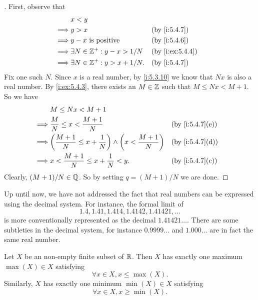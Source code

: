 \begin{proof}[]
  First, observe that
  \begin{align*}
             & x < y                                                    \\
    \implies & y > x                               &  & \by{i:5.4.7}    \\
    \implies & y - x \text{ is positive}           &  & \by{i:5.4.6}    \\
    \implies & \exists N \in \Z^+ : y - x > 1 / N  &  & \by{i:ex:5.4.4} \\
    \implies & \exists N \in \Z^+ : y > x + 1 / N. &  & \by{i:5.4.7}
  \end{align*}
  Fix one such \(N\).
  Since \(x\) is a real number, by \cref{i:5.3.10} we know that \(Nx\) is also a real number.
  By \cref{i:ex:5.4.3}, there exists an \(M \in \mathbb{Z}\) such that \(M \leq Nx < M + 1\).
  So we have
  \begin{align*}
             & M \leq Nx < M + 1                                                                                \\
    \implies & \dfrac{M}{N} \leq x < \dfrac{M + 1}{N}                                      &  & \by{i:5.4.7}[e] \\
    \implies & \pa{\dfrac{M + 1}{N} \leq x + \dfrac{1}{N}} \land \pa{x < \dfrac{M + 1}{N}} &  & \by{i:5.4.7}[d] \\
    \implies & x < \dfrac{M + 1}{N} \leq x + \dfrac{1}{N} < y.                             &  & \by{i:5.4.7}[c]
  \end{align*}
  Clearly, \((M + 1) / N \in \mathbb{Q}\).
  So by setting \(q = (M + 1) / N\) we are done.
\end{proof}

\begin{rmk}\label{i:5.4.15}
  Up until now, we have not addressed the fact that real numbers can be expressed using the decimal system.
  For instance, the formal limit of
  \[
    1.4, 1.41, 1.414, 1.4142, 1.41421, \dots
  \]
  is more conventionally represented as the decimal \(1.41421\dots\).
  There are some subtleties in the decimal system, for instance \(0.9999\dots\) and \(1.000\dots\) are in fact the same real number.
\end{rmk}

\begin{ac}\label{i:ac:5.4.2}
  Let \(X\) be an non-empty finite subset of \(\mathbb{R}\).
  Then \(X\) has exactly one maximum \(\max(X) \in X\) satisfying
  \[
    \forall x \in X, x \leq \max(X).
  \]
  Similarly, \(X\) has exactly one minimum \(\min(X) \in X\) satisfying
  \[
    \forall x \in X, x \geq \min(X).
  \]
\end{ac}

